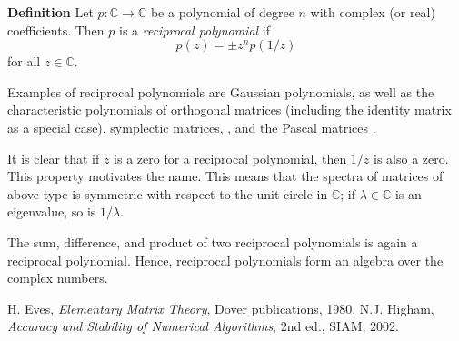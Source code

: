 \documentclass[12pt]{article}
\begin{document}

{\bf Definition} \cite{eves}
Let $p:\mathbb{C}\to\mathbb{C}$
be a polynomial of degree $n$ with complex (or real)
coefficients. Then $p$  is a \emph{reciprocal polynomial} if
$$
   p(z) = \pm z^n p(1/z)
$$
for all $z\in \mathbb{C}$.

Examples of reciprocal polynomials are Gaussian polynomials, as well as the characteristic polynomials of orthogonal matrices (including the identity matrix as a special case), symplectic matrices, , and the Pascal matrices \cite{higham}. 

It is clear that if $z$ is a zero for a reciprocal polynomial, then
$1/z$ is also a zero. This property motivates the name. This
means that the spectra of matrices of above type is symmetric
with respect to the unit circle in $\mathbb{C}$; if $\lambda\in \mathbb{C}$ is an
eigenvalue, so is $1/\lambda$. 

The sum, difference, and product of two reciprocal polynomials is again a reciprocal polynomial.  Hence, reciprocal polynomials form an algebra over the complex numbers.

\begin{thebibliography}{9}
 H. Eves,
 \emph{Elementary Matrix Theory},
 Dover publications, 1980.
 N.J. Higham, \emph{Accuracy and Stability of Numerical Algorithms}, 
2nd ed., SIAM, 2002. 
\end{thebibliography}
\end{document}
